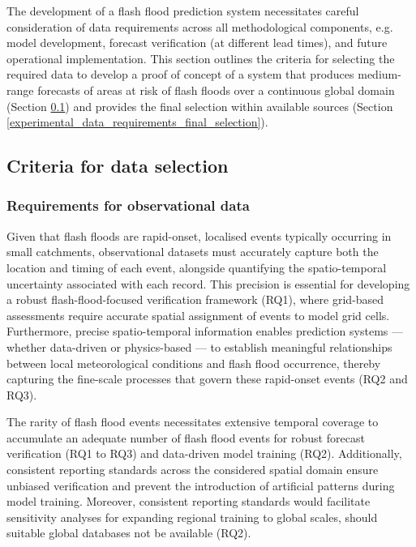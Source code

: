 The development of a flash flood prediction system necessitates careful consideration of data requirements across all methodological components, e.g. model development, forecast verification (at different lead times), and future operational implementation. This section outlines the criteria for selecting the required data to develop a proof of concept of a system that produces medium-range forecasts of areas at risk of flash floods over a continuous global domain (Section \ref{experimental_data_requirements_data_selection_criteria}) and provides the final selection within available sources (Section \ref{experimental_data_requirements_final_selection}). 


\subsection{Criteria for data selection}
\label{experimental_data_requirements_data_selection_criteria}

\subsubsection{Requirements for observational data}

Given  that flash floods are rapid-onset, localised events typically occurring in small catchments, observational datasets must accurately capture both the location and timing of each event, alongside quantifying the spatio-temporal uncertainty associated with each record. This precision is essential for developing a robust flash-flood-focused verification framework (RQ1), where grid-based assessments require accurate spatial assignment of events to model grid cells. Furthermore, precise spatio-temporal information enables prediction systems — whether data-driven or physics-based — to establish meaningful relationships between local meteorological conditions and flash flood occurrence, thereby capturing the fine-scale processes that govern these rapid-onset events (RQ2 and RQ3).

The  rarity of flash flood events necessitates extensive temporal coverage to accumulate an adequate number of flash flood events for robust forecast verification (RQ1 to RQ3) and data-driven model training (RQ2). Additionally, consistent reporting standards across the considered spatial domain ensure unbiased verification and prevent the introduction of artificial patterns during model training. Moreover, consistent reporting standards would facilitate sensitivity analyses for expanding regional training to global scales, should suitable global databases not be available (RQ2).

